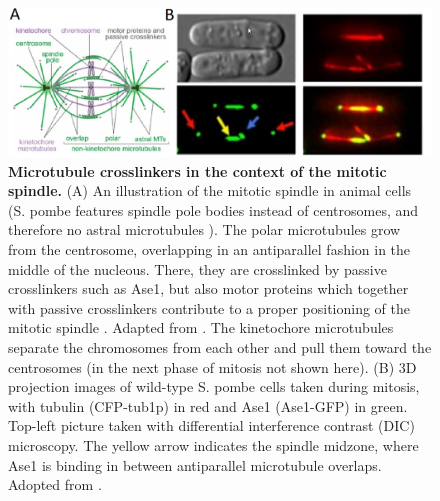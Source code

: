 \begin{figure}[h!tb]
	\centering
	\includegraphics[width=\linewidth]{Figures/spindle.png}
	\caption[Microtubule crosslinkers in the context of the mitotic spindle.]{\textbf{Microtubule crosslinkers in the context of the mitotic spindle.}
	(A) An illustration of the mitotic spindle in animal cells (S. pombe features spindle pole bodies instead of centrosomes, and therefore no astral microtubules \parencite{Kilmartin2014}). The polar microtubules grow from the centrosome, overlapping in an antiparallel fashion in the middle of the nucleous. There, they are crosslinked by passive crosslinkers such as Ase1, but also motor proteins which together with passive crosslinkers contribute to a proper positioning of the mitotic spindle \parencite{Janson2007,Braun2011}. Adapted from \cite{Tolic2018}. The kinetochore microtubules separate the chromosomes from each other and pull them toward the centrosomes (in the next phase of mitosis not shown here). (B) 3D projection images of wild-type S. pombe cells taken during mitosis, with tubulin (CFP-tub1p) in red and Ase1 (Ase1-GFP) in green. Top-left picture taken with differential interference contrast (DIC) microscopy. The yellow arrow indicates the spindle midzone, where Ase1 is binding in between antiparallel microtubule overlaps. Adopted from \cite{Loiodice2005}.
		}\label{spindle}
\end{figure}

